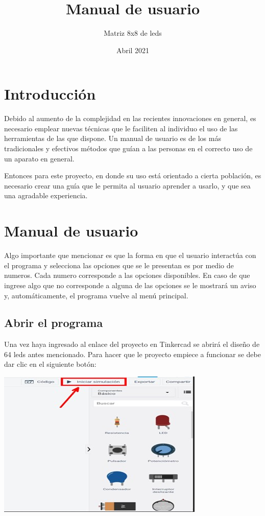 \documentclass{article}
\title{Manual de usuario}
\author{Matriz 8x8 de leds}
\date{Abril 2021}
\begin{document}
\maketitle

\section{Introducción}
Debido al aumento de la complejidad en las recientes innovaciones en general, es necesario emplear nuevas técnicas que le faciliten al individuo el uso de las herramientas de las que dispone. Un manual de usuario es de los más tradicionales y efectivos métodos que guían a las personas en el correcto uso de un aparato en general. 

Entonces para este proyecto, en donde su uso está orientado a cierta población, es necesario crear una guía que le permita al usuario aprender a usarlo, y que sea una agradable experiencia.

\section{Manual de usuario}
Algo importante que mencionar es que la forma en que el usuario interactúa con el programa y selecciona las opciones que se le presentan es por medio de numeros. Cada numero corresponde a las opciones disponibles. En caso de que ingrese algo que no corresponde a alguna de las opciones se le mostrará un aviso y, automáticamente, el programa vuelve al menú principal. 

\subsection{Abrir el programa}
Una vez haya ingresado al enlace del proyecto en Tinkercad
se abrirá el diseño de 64 leds antes mencionado.
Para hacer que le proyecto empiece a funcionar se debe dar clic en el siguiente botón:

\includegraphics[scale=0.6]{images/IniciarSimulacion.jpg}
\newline
\end{document}
